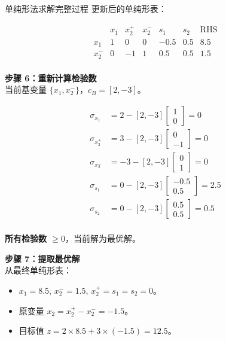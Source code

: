 \begin{exbox}{单纯形法求解完整过程}{}
        更新后的单纯形表：
        
        \[
        \begin{array}{cccccc|c}
         & x_1 & x_2^+ & x_2^- & s_1 & s_2 & \text{RHS} \\
        \hline
        x_1 & 1 & 0 & 0 & -0.5 & 0.5 & 8.5 \\
        x_2^- & 0 & -1 & 1 & 0.5 & 0.5 & 1.5 \\
        \end{array}
        \]
        
        
        \textbf{步骤 6：重新计算检验数}\\
        当前基变量 \( \{x_1, x_2^-\} \)，\( c_B = [2, -3] \)。
        
        \begin{align*}
        \sigma_{x_1} &= 2 - [2, -3] \begin{bmatrix}1\\0\end{bmatrix} = 0 \\
        \sigma_{x_2^+} &= 3 - [2, -3] \begin{bmatrix}0\\-1\end{bmatrix} = 0 \\
        \sigma_{x_2^-} &= -3 - [2, -3] \begin{bmatrix}0\\1\end{bmatrix} = 0 \\
        \sigma_{s_1} &= 0 - [2, -3] \begin{bmatrix}-0.5\\0.5\end{bmatrix} = 2.5 \\
        \sigma_{s_2} &= 0 - [2, -3] \begin{bmatrix}0.5\\0.5\end{bmatrix} = 0.5 \\
        \end{align*}
        
        \textbf{所有检验数 \( \geq 0 \)}，当前解为最优解。
        
        
        \textbf{步骤 7：提取最优解}\\
        从最终单纯形表：
        \begin{itemize}
          \item \( x_1 = 8.5 \), \( x_2^- = 1.5 \), \( x_2^+ = s_1 = s_2 = 0 \)。
          \item 原变量 \( x_2 = x_2^+ - x_2^- = -1.5 \)。
          \item 目标值 \( z = 2 \times 8.5 + 3 \times (-1.5) = 12.5 \)。
        \end{itemize}
        

\end{exbox}
